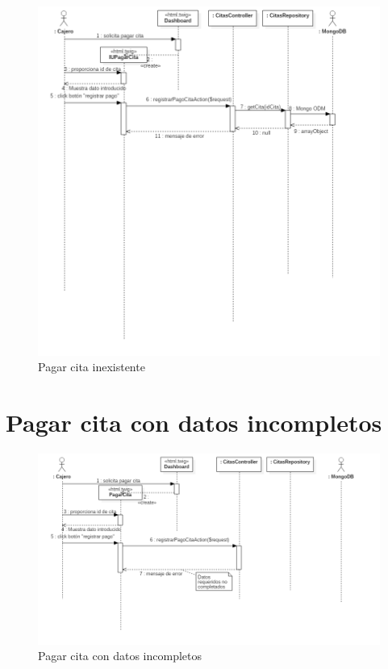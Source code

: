 \begin{figure}[htbp!]
	\centering
	\includegraphics[width=1\textwidth]{uml/DiagramasSecuencia/DavidPacheco/pagar-cita-cita-no-existe}
	\caption{Pagar cita inexistente}
\end{figure}

\section{Pagar cita con datos incompletos}

\begin{figure}[htbp!]
	\centering
	\includegraphics[width=1\textwidth]{uml/DiagramasSecuencia/DavidPacheco/pagar-cita-datos-incompletos}
	\caption{Pagar cita con datos incompletos}
\end{figure}

